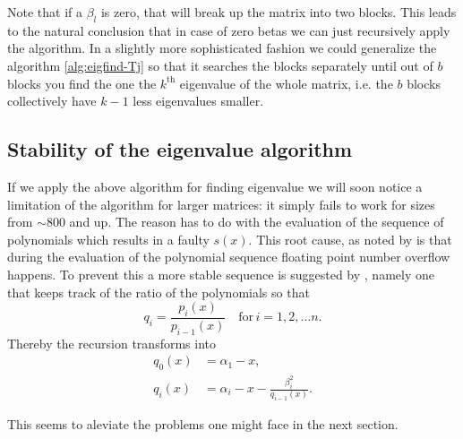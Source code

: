 \documentclass{article}
\begin{document}
Note that if a $\beta_l$ is zero, that will break up the matrix into two blocks. This leads to the natural conclusion that in case of zero betas we can just recursively apply the algorithm. In a slightly more sophisticated fashion we could generalize the algorithm \autoref{alg:eigfind-Tj} so that it searches the blocks separately until out of $b$ blocks you find the one the $k^{\mathrm{th}}$ eigenvalue of the whole matrix, i.e. the $b$ blocks collectively have $k-1$ less eigenvalues smaller.

\subsection{Stability of the eigenvalue algorithm}

If we apply the above algorithm for finding eigenvalue we will soon notice a limitation of the algorithm for larger matrices: it simply fails to work for sizes from $\sim 800$ and up. The reason has to do with the evaluation of the sequence of polynomials which results in a faulty $s(x)$. This root cause, as noted by \textcite{stable_polys_Barth_Martin_Wilkinson_1967} is that during the evaluation of the polynomial sequence floating point number overflow happens. To prevent this a more stable sequence is suggested by \autocite{stable_polys_Barth_Martin_Wilkinson_1967}, namely one that keeps track of the ratio of the polynomials so that 
\begin{equation}
	q_{i} = \frac{p_i(x)}{p_{i-1}(x)} \quad \mathrm{for}\, i = 1, 2, \dots n.
\end{equation}
Thereby the recursion transforms into 
\begin{align}
	q_{0}(x) &= \alpha_1 - x,\\
	q_{i}(x) &= \alpha_i - x - \frac{\beta_{i}^2}{q_{i-1}(x)}.
\end{align}

This seems to aleviate the problems one might face in the next section.
\end{document}
